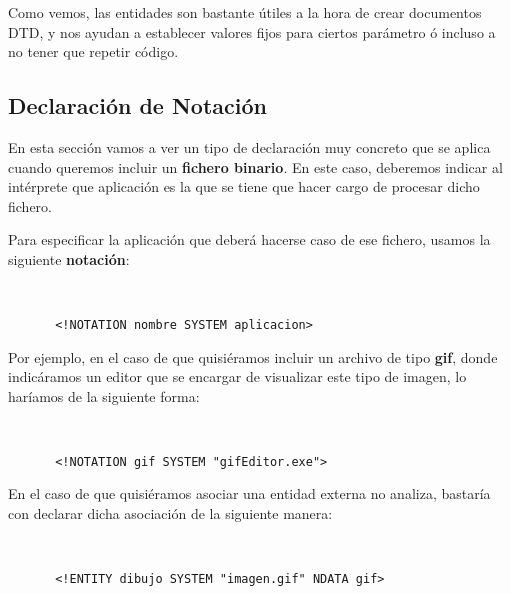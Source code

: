 Como vemos, las entidades son bastante útiles a la hora de crear documentos DTD, y nos ayudan a establecer valores fijos para ciertos parámetro ó incluso a no tener que repetir código.

\subsection{Declaración de Notación}
En esta sección vamos a ver un tipo de declaración muy concreto que se aplica cuando queremos incluir un \textbf{fichero binario}. En este caso, deberemos indicar al intérprete que aplicación es la que se tiene que hacer cargo de procesar dicho fichero.

Para especificar la aplicación que deberá hacerse caso de ese fichero, usamos la siguiente \textbf{notación}:

\begin{figure}[h]
    \begin{tcolorbox}[sharp corners, colback=yellow!30, colframe=white!20]
        \scriptsize
        \begin{verbatim}


 <!NOTATION nombre SYSTEM aplicacion>
        \end{verbatim}
    \end{tcolorbox}
\end{figure}

Por ejemplo, en el caso de que quisiéramos incluir un archivo de tipo \textbf{gif}, donde indicáramos un editor que se encargar de visualizar este tipo de imagen, lo haríamos de la siguiente forma:

\begin{figure}[H]
    \begin{tcolorbox}[sharp corners, colback=yellow!30, colframe=white!20]
        \scriptsize
        \begin{verbatim}


 <!NOTATION gif SYSTEM "gifEditor.exe">
        \end{verbatim}
    \end{tcolorbox}
\end{figure}

En el caso de que quisiéramos asociar una entidad externa no analiza, bastaría con declarar dicha asociación de la siguiente manera:

\begin{figure}[H]
    \begin{tcolorbox}[sharp corners, colback=yellow!30, colframe=white!20]
        \scriptsize
        \begin{verbatim}


 <!ENTITY dibujo SYSTEM "imagen.gif" NDATA gif>
        \end{verbatim}
    \end{tcolorbox}
\end{figure}

